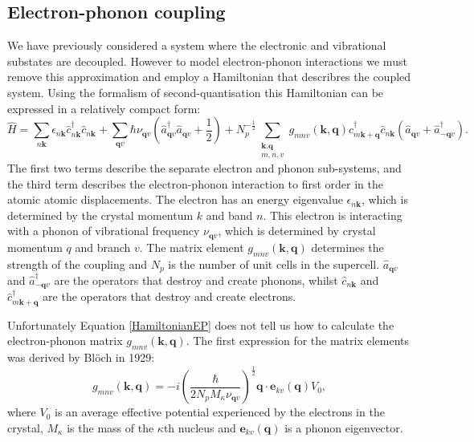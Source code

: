 \subsection{Electron-phonon coupling}
We have previously considered a system where the electronic and vibrational substates are decoupled. %
However to model electron-phonon interactions we must remove this approximation and employ a Hamiltonian that describres the coupled system. Using the formalism of second-quantisation this Hamiltonian can be expressed in a relatively compact form:\autocite{Giustino2017}
\begin{equation} \label{HamiltonianEP}
    \hat{H} = \sum_{n\textbf{k}}\epsilon_{n\textbf{k}}\hat{c}^{\dagger}_{n\textbf{k}}\hat{c}_{n\textbf{k}} + \sum_{\textbf{q}v}\hbar\nu_{\textbf{q}v}(\hat{a}^{\dagger}_{\textbf{q}v}\hat{a}_{\textbf{q}v}+\frac{1}{2})+N_p^{-\frac{1}{2}}\sum_{\substack{\textbf{k},\textbf{q} \\ m,n,v}}g_{mnv}(\textbf{k},\textbf{q})\hat{c}^{\dagger}_{m\textbf{k}+\textbf{q}}\hat{c}_{n\textbf{k}}(\hat{a}_{\textbf{q}v}+\hat{a}^{\dagger}_{-\textbf{q}v}).
\end{equation}
The first two terms describe the separate electron and phonon sub-systems, and the third term describes the electron-phonon interaction to first order in the atomic atomic displacements. The electron has an energy eigenvalue $\epsilon_{n\textbf{k}}$, which is determined by the crystal momentum $k$ and band $n$. This electron is interacting with a phonon of vibrational frequency $\nu_{\textbf{q}v}$, which is determined by crystal momentum $q$ and branch $v$. The matrix element $g_{mnv}(\textbf{k},\textbf{q})$ determines the strength of the coupling and $N_p$ is the number of unit cells in the supercell. $\hat{a}_{\textbf{q}v}$ and $\hat{a}^{\dagger}_{-\textbf{q}v}$ are the operators that destroy and create phonons, whilst
$\hat{c}_{n\textbf{k}}$ and $\hat{c}^{\dagger}_{m\textbf{k}+\textbf{q}}$ are the operators that destroy and create electrons.

Unfortunately Equation \ref{HamiltonianEP} does not tell us how to calculate the electron-phonon matrix $g_{mnv}(\textbf{k},\textbf{q})$. The first expression for the matrix elements was derived by Bl\"{o}ch in 1929:\autocite{Giustino2017}
\begin{equation}
g_{mnv}(\textbf{k},\textbf{q}) = -i\left(\frac{\hbar}{2N_pM_\kappa\nu_{\textbf{q}v}}\right)^{\frac{1}{2}}\textbf{q}\cdot\textbf{e}_{kv}(\textbf{q})V_0,
\end{equation}
where $V_0$ is an average effective potential experienced by the electrons in the crystal, $M_\kappa$ is the mass of the $\kappa$th nucleus and $\textbf{e}_{kv}(\textbf{q})$ is a phonon eigenvector.

